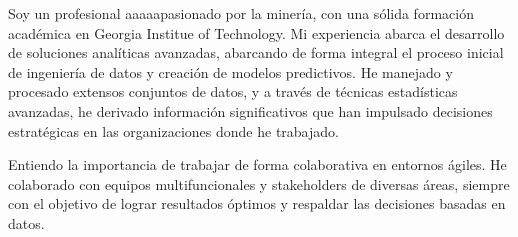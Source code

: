%
%
%
\par{
Soy un profesional aaaaapasionado por la minería, con una sólida formación académica en Georgia Institue of Technology.
Mi experiencia abarca el desarrollo de soluciones analíticas avanzadas, abarcando de forma integral el proceso inicial de ingeniería de datos y creación de modelos predictivos. He manejado y procesado extensos conjuntos de datos, y a través de técnicas estadísticas avanzadas, he derivado información significativos que han impulsado decisiones estratégicas en las organizaciones donde he trabajado.

Entiendo la importancia de trabajar de forma colaborativa en entornos ágiles. He colaborado con equipos multifuncionales y stakeholders de diversas áreas, siempre con el objetivo de lograr resultados óptimos y respaldar las decisiones basadas en datos.
}